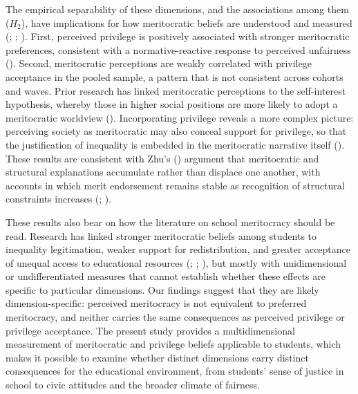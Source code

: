 \documentclass[
  11pt,
]{article}
\begin{document}
The empirical separability of these dimensions, and the associations
among them (\(H_2\)), have implications for how meritocratic beliefs are
understood and measured
(;
;
). First, perceived
privilege is positively associated with stronger meritocratic
preferences, consistent with a normative-reactive response to perceived
unfairness (). Second, meritocratic perceptions are weakly correlated with
privilege acceptance in the pooled sample, a pattern that is not
consistent across cohorts and waves. Prior research has linked
meritocratic perceptions to the self-interest hypothesis, whereby those
in higher social positions are more likely to adopt a meritocratic
worldview ().
Incorporating privilege reveals a more complex picture: perceiving
society as meritocratic may also conceal support for privilege, so that
the justification of inequality is embedded in the meritocratic
narrative itself (). These results are consistent with Zhu's
() argument that meritocratic
and structural explanations accumulate rather than displace one another,
with accounts in which merit endorsement remains stable as recognition
of structural constraints increases (; ).

These results also bear on how the literature on school meritocracy
should be read. Research has linked stronger meritocratic beliefs among
students to inequality legitimation, weaker support for redistribution,
and greater acceptance of unequal access to educational resources
(;
;
), but
mostly with unidimensional or undifferentiated measures that cannot
establish whether these effects are specific to particular dimensions.
Our findings suggest that they are likely dimension-specific: perceived
meritocracy is not equivalent to preferred meritocracy, and neither
carries the same consequences as perceived privilege or privilege
acceptance. The present study provides a multidimensional measurement of
meritocratic and privilege beliefs applicable to students, which makes
it possible to examine whether distinct dimensions carry distinct
consequences for the educational environment, from students' sense of
justice in school to civic attitudes and the broader climate of
fairness.
\end{document}
